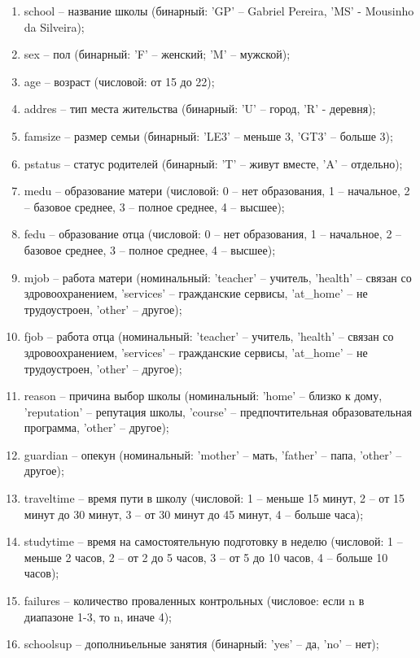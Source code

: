 \begin{enumerate}
    \item school -- название школы (бинарный: 'GP' -- Gabriel Pereira, 'MS' - Mousinho da Silveira);
    \item sex -- пол (бинарный: 'F' -- женский; 'M' -- мужской);
    \item age -- возраст (числовой: от 15 до 22);
    \item addres -- тип места жительства (бинарный: 'U' -- город, 'R' - деревня);
    \item famsize -- размер семьи (бинарный: 'LE3' -- меньше 3, 'GT3' -- больше 3);
    \item pstatus -- статус родителей (бинарный: 'T' -- живут вместе, 'A' -- отдельно);
    \item medu -- образование матери (числовой: 0 -- нет образования, 1 -- начальное, 2 -- базовое среднее, 3 -- полное среднее, 4 -- высшее);
    \item fedu -- образование отца (числовой: 0 -- нет образования, 1 -- начальное, 2 -- базовое среднее, 3 -- полное среднее, 4 -- высшее);
    \item mjob -- работа матери (номинальный: 'teacher' -- учитель, 'health' -- связан со здровоохранением, 'services' -- гражданские сервисы, 'at\_home' -- не трудоустроен, 'other' -- другое);
    \item fjob -- работа отца (номинальный: 'teacher' -- учитель, 'health' -- связан со здровоохранением, 'services' -- гражданские сервисы, 'at\_home' -- не трудоустроен, 'other' -- другое);
    \item reason -- причина выбор школы (номинальный: 'home' -- близко к дому, 'reputation' -- репутация школы, 'course' -- предпочтительная образовательная программа, 'other' -- другое);
    \item guardian -- опекун (номинальный:  'mother' -- мать, 'father' -- папа, 'other' -- другое);
    \item traveltime -- время пути в школу (числовой: 1 -- меньше 15 минут, 2 -- от 15 минут до 30 минут, 3 -- от 30 минут до 45 минут, 4 -- больше часа);
    \item studytime -- время на самостоятельную подготовку в неделю (числовой: 1 -- меньше 2 часов, 2 -- от 2 до 5 часов, 3 -- от 5 до 10 часов, 4 -- больше 10 часов);
    \item failures -- количество проваленных контрольных (числовое: если n в диапазоне 1-3, то n, иначе 4);
    \item schoolsup -- дополниьельные занятия (бинарный: 'yes' -- да, 'no' -- нет);

\end{enumerate}
